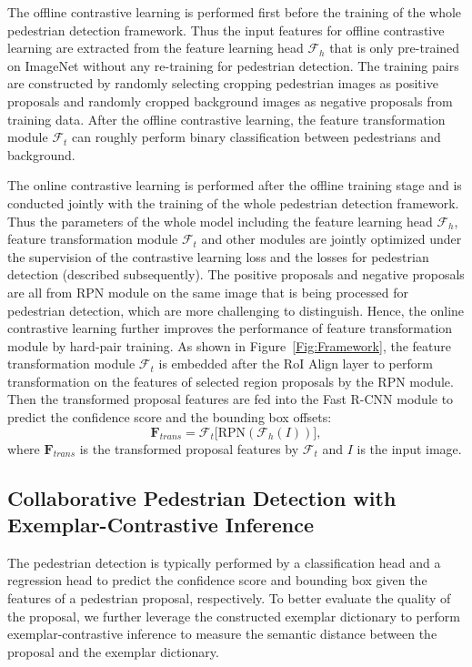 \documentclass[journal]{IEEEtran}
\begin{document}
The offline contrastive learning is performed first before the training of the whole pedestrian detection framework. Thus the input features for offline contrastive learning are extracted from the feature learning head $\mathcal{F}_h$ that is only pre-trained on ImageNet without any re-training for pedestrian detection. The training pairs are constructed by randomly selecting cropping pedestrian images as positive proposals and randomly cropped background images as negative proposals from training data. After the offline contrastive learning, the feature transformation module $\mathcal{F}_t$ can roughly perform binary classification between pedestrians and background.

The online contrastive learning is performed after the offline training stage and is conducted jointly with the training of the whole pedestrian detection framework. Thus the parameters of the whole model including the feature learning head $\mathcal{F}_h$, feature transformation module $\mathcal{F}_t$ and other modules are jointly optimized under the supervision of the contrastive learning loss and the losses for pedestrian detection (described subsequently). The positive proposals and negative proposals are all from RPN module on the same image that is being processed for pedestrian detection, which are more challenging to distinguish. Hence, the online contrastive learning further improves the performance of feature transformation module by hard-pair training.
As shown in Figure~\ref{Fig:Framework}, the feature transformation module $\mathcal{F}_t$ is embedded after the RoI Align layer to perform transformation on the features of selected region proposals by the RPN module. Then the transformed proposal features are fed into the Fast R-CNN module to predict the confidence score and the bounding box offsets:
\begin{equation}
    \mathbf{F}_{trans} = \mathcal{F}_t \big[\text{RPN}(\mathcal{F}_h(I))\big],
\end{equation}
where $\mathbf{F}_{trans}$ is the transformed proposal features by $\mathcal{F}_t$ and $I$ is the input image.


\subsection{Collaborative Pedestrian Detection with Exemplar-Contrastive Inference}
The pedestrian detection is typically performed by a classification head and a regression head to predict the confidence score and bounding box given the features of a pedestrian proposal, respectively.  To better evaluate the quality of the proposal, we further leverage the constructed exemplar dictionary to perform exemplar-contrastive inference to measure the semantic distance between the proposal and the exemplar dictionary. 
\end{document}
